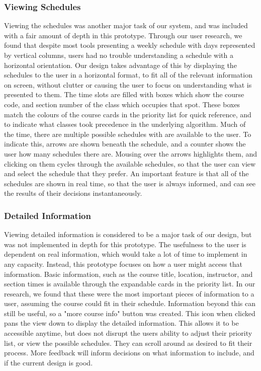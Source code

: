 \documentclass{article}
\begin{document}
\subsubsection{Viewing Schedules}
Viewing the schedules was another major task of our system, and was included with a fair amount of depth in this prototype. Through our user research, we found that despite most tools presenting a weekly schedule with days represented by vertical columns, users had no trouble understanding a schedule with a horizontal orientation. Our design takes advantage of this by displaying the schedules to the user in a horizontal format, to fit all of the relevant information on screen, without clutter or causing the user to focus on understanding what is presented to them. The time slots are filled with boxes which show the course code, and section number of the class which occupies that spot. These boxes match the colours of the course cards in the priority list for quick reference, and to indicate what classes took precedence in the underlying algorithm.
\newline
\newline
Much of the time, there are multiple possible schedules with are available to the user. To indicate this, arrows are shown beneath the schedule, and a counter shows the user how many schedules there are. Mousing over the arrows highlights them, and clicking on them cycles through the available schedules, so that the user can view and select the schedule that they prefer. An important feature is that all of the schedules are shown in real time, so that the user is always informed, and can see the results of their decisions instantaneously.


\subsubsection{Detailed Information}
Viewing detailed information is considered to be a major task of our design, but was not implemented in depth for this prototype. The usefulness to the user is dependent on real information, which would take a lot of time to implement in any capacity. Instead, this prototype focuses on how a user might access that information. Basic information, such as the course title, location, instructor, and section times is available through the expandable cards in the priority list. In our research, we found that these were the most important pieces of information to a user, assuming the course could fit in their schedule. Information beyond this can still be useful, so a "more course info" button was created. This icon when clicked pans the view down to display the detailed information. This allows it to be accessible anytime, but does not disrupt the users ability to adjust their priority list, or view the possible schedules. They can scroll around as desired to fit their process. More feedback will inform decisions on what information to include, and if the current design is good.
\end{document}
